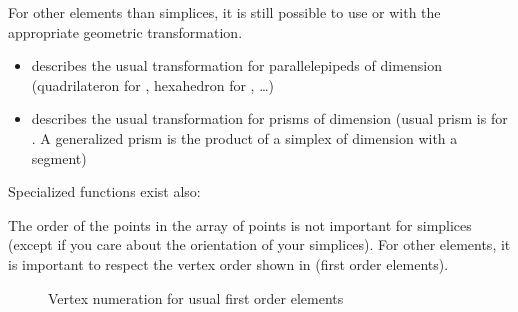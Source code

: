 \documentclass[a4paper,11pt,english]{sphinxmanual}
\begin{document}
For other elements than simplices, it is still possible to use
 or  with the appropriate
geometric transformation.
\begin{itemize}
\item {} 
 describes the usual transformation for
parallelepipeds of dimension  (quadrilateron for , hexahedron for
, …)

\item {} 
 describes the usual transformation for prisms of
dimension  (usual prism is for . A generalized prism is the product
of a simplex of dimension  with a segment)

\end{itemize}

Specialized functions exist also:

\begin{sphinxVerbatim}[commandchars=\\\{\}]
 
 
 
 
\end{sphinxVerbatim}

The order of the points in the array of points is not important for simplices
(except if you care about the orientation of your simplices). For other elements, it is important to respect the vertex order shown in {\hyperref[\detokenize{userdoc/bmesh:ud-fig-elem}]{}} (first order elements).

\begin{figure}[htbp]
\centering
\capstart

\noindent{}
\caption{Vertex numeration for usual first order elements}\label{\detokenize{userdoc/bmesh:id2}}\label{\detokenize{userdoc/bmesh:ud-fig-elem}}\end{figure}
\end{document}
